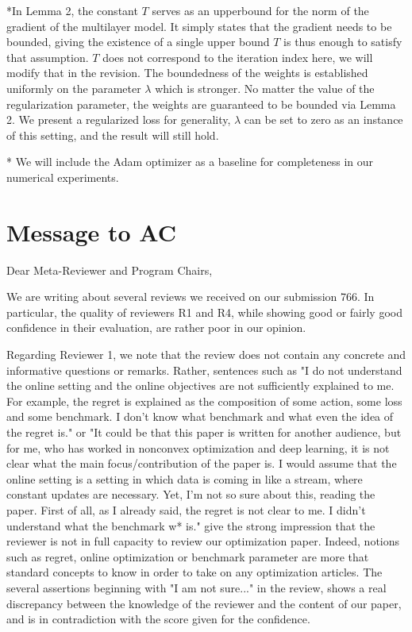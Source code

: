 \documentclass{article}
\begin{document}
*In Lemma 2, the constant $T$ serves as an upperbound for the norm of the gradient of the multilayer model. It simply states that the gradient needs to be bounded, giving the existence of a single upper bound $T$ is thus enough to satisfy that assumption. $T$ does not correspond to the iteration index here, we will modify that in the revision.
The boundedness of the weights is established uniformly on the parameter $\lambda$ which is stronger. No matter the value of the regularization parameter, the weights are guaranteed to be bounded via Lemma 2. We present a regularized loss for generality, $\lambda$ can be set to zero as an instance of this setting, and the result will still hold.

* We will include the Adam optimizer as a baseline for completeness in our numerical experiments.




\newpage

\section{Message to AC}



Dear Meta-Reviewer and Program Chairs,

We are writing about several reviews we received on our submission 766.
In particular, the quality of reviewers R1 and R4, while showing good or fairly good confidence in their evaluation, are rather poor in our opinion.

Regarding Reviewer 1, we note that the review does not contain any concrete and informative questions or remarks. 
Rather, sentences such as "I do not understand the online setting and the online objectives are not sufficiently explained to me. For example, the regret is explained as the composition of some action, some loss and some benchmark. I don't know what benchmark and what even the idea of the regret is." or "It could be that this paper is written for another audience, but for me, who has worked in nonconvex optimization and deep learning, it is not clear what the main focus/contribution of the paper is. I would assume that the online setting is a setting in which data is coming in like a stream, where constant updates are necessary. Yet, I'm not so sure about this, reading the paper. First of all, as I already said, the regret is not clear to me. I didn't understand what the benchmark w* is." give the strong impression that the reviewer is not in full capacity to review our optimization paper. Indeed, notions such as regret, online optimization or benchmark parameter are more that standard concepts to know in order to take on any optimization articles.
The several assertions beginning with "I am not sure..." in the review, shows a real discrepancy between the knowledge of the reviewer and the content of our paper, and is in contradiction with the score given for the confidence.
\end{document}
